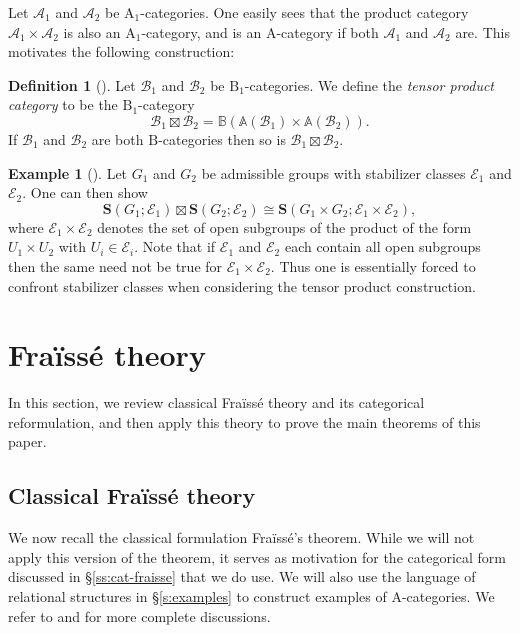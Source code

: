 \documentclass[12pt]{amsart}
\numberwithin{equation}{section}
\theoremstyle{definition}
\newtheorem{eg}[equation]{Example}
\newenvironment{example}[1][]{\begin{eg}[#1] \pushQED{\qed}}{\popQED \end{eg}}
\newtheorem{defnaux}[equation]{Definition}
\newenvironment{definition}[1][]{\begin{defnaux}[#1]\pushQED{\qed}}{\popQED \end{defnaux}}
\newcommand{\cA}{\mathcal{A}}
\newcommand{\rA}{\mathrm{A}}
\newcommand{\cB}{\mathcal{B}}
\newcommand{\rB}{\mathrm{B}}
\newcommand{\sE}{\mathscr{E}}
\newcommand{\bS}{\mathbf{S}}
\newcommand{\defn}[1]{\emph{#1}}
\renewcommand{\AA}{\mathbb{A}}
\newcommand{\BB}{\mathbb{B}}
\begin{document}
Let $\cA_1$ and $\cA_2$ be $\rA_1$-categories. One easily sees that the product category $\cA_1 \times \cA_2$ is also an $\rA_1$-category, and is an $\rA$-category if both $\cA_1$ and $\cA_2$ are. This motivates the following construction:

\begin{definition}
Let $\cB_1$ and $\cB_2$ be $\rB_1$-categories. We define the \defn{tensor product category} to be the $\rB_1$-category
\begin{displaymath}
\cB_1 \boxtimes \cB_2 = \BB(\AA(\cB_1) \times \AA(\cB_2)).
\end{displaymath}
If $\cB_1$ and $\cB_2$ are both $\rB$-categories then so is $\cB_1 \boxtimes \cB_2$.
\end{definition}

\begin{example}
Let $G_1$ and $G_2$ be admissible groups with stabilizer classes $\sE_1$ and $\sE_2$. One can then show
\begin{displaymath}
\bS(G_1; \sE_1) \boxtimes \bS(G_2; \sE_2) \cong \bS(G_1 \times G_2; \sE_1 \times \sE_2),
\end{displaymath}
where $\sE_1 \times \sE_2$ denotes the set of open subgroups of the product of the form $U_1 \times U_2$ with $U_i \in \sE_i$. Note that if $\sE_1$ and $\sE_2$ each contain all open subgroups then the same need not be true for $\sE_1 \times \sE_2$. Thus one is essentially forced to confront stabilizer classes when considering the tensor product construction.
\end{example}

\section{Fra\"iss\'e theory} \label{s:fraisse}

In this section, we review classical Fra\"iss\'e theory and its categorical reformulation, and then apply this theory to prove the main theorems of this paper.

\subsection{Classical Fra\"iss\'e theory} \label{ss:fraisse-class}

We now recall the classical formulation Fra\"iss\'e's theorem. While we will not apply this version of the theorem, it serves as motivation for the categorical form discussed in \S \ref{ss:cat-fraisse} that we do use. We will also use the language of relational structures in \S \ref{s:examples} to construct examples of $\rA$-categories. We refer to \cite{CameronBook} and \cite{Macpherson} for more complete discussions.
\end{document}
